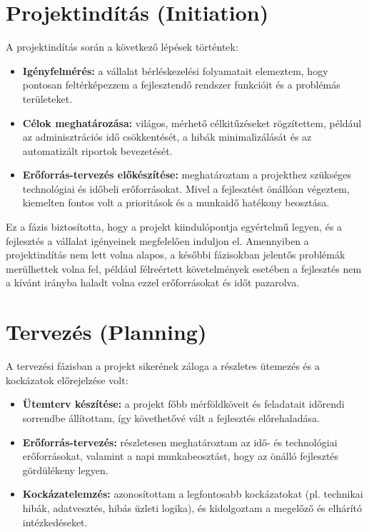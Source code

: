\section{Projektindítás (Initiation)}

A projektindítás során a következő lépések történtek:
\begin{itemize}
    \item \textbf{Igényfelmérés:} a vállalat bérléskezelési folyamatait elemeztem, hogy pontosan feltérképezzem a fejlesztendő rendszer funkcióit és a problémás területeket.
    \item \textbf{Célok meghatározása:} világos, mérhető célkitűzéseket rögzítettem, például az adminisztrációs idő csökkentését, a hibák minimalizálását és az automatizált riportok bevezetését.
    \item \textbf{Erőforrás-tervezés előkészítése:} meghatároztam a projekthez szükséges technológiai és időbeli erőforrásokat. 
    Mivel a fejlesztést önállóan végeztem, kiemelten fontos volt a prioritások és a munkaidő hatékony beosztása.
\end{itemize}

Ez a fázis biztosította, hogy a projekt kiindulópontja egyértelmű legyen, és a fejlesztés a vállalat igényeinek megfelelően induljon el.
Amennyiben a projektindítás nem lett volna alapos, a későbbi fázisokban jelentős problémák merülhettek volna fel, 
például félreértett követelmények esetében a fejlesztés nem a kívánt irányba haladt volna ezzel erőforrásokat és időt pazarolva.

\section{Tervezés (Planning)}

A tervezési fázisban a projekt sikerének záloga a részletes ütemezés és a kockázatok előrejelzése volt:
\begin{itemize}
    \item \textbf{Ütemterv készítése:} a projekt főbb mérföldköveit és feladatait időrendi sorrendbe állítottam, így követhetővé vált a fejlesztés előrehaladása.
    \item \textbf{Erőforrás-tervezés:} részletesen meghatároztam az idő- és technológiai erőforrásokat, valamint a napi munkabeosztást, hogy az önálló fejlesztés gördülékeny legyen.
    \item \textbf{Kockázatelemzés:} azonosítottam a legfontosabb kockázatokat (pl. technikai hibák, adatvesztés, hibás üzleti logika), és kidolgoztam a megelőző és elhárító intézkedéseket.
\end{itemize}

